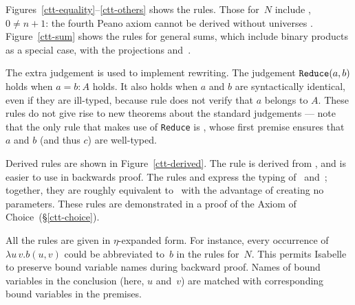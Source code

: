 Figures~\ref{ctt-equality}--\ref{ctt-others} shows the rules.  Those
for~$N$ include , $0\not=n+1$: the fourth Peano axiom
cannot be derived without universes \cite[page 91]{martinlof84}.
Figure~\ref{ctt-sum} shows the rules for general sums, which include binary
products as a special case, with the projections 
and~.

The extra judgement  is used to implement rewriting.  The
judgement ${\tt Reduce}(a,b)$ holds when $a=b:A$ holds.  It also holds
when $a$ and $b$ are syntactically identical, even if they are ill-typed,
because rule  does not verify that $a$ belongs to $A$.  These
rules do not give rise to new theorems about the standard judgements ---
note that the only rule that makes use of {\tt Reduce} is ,
whose first premise ensures that $a$ and $b$ (and thus $c$) are well-typed.

Derived rules are shown in Figure~\ref{ctt-derived}.  The rule
 is derived from , and is easier to
use in backwards proof.  The rules  and
 express the typing of~ and~;
together, they are roughly equivalent to~ with the advantage
of creating no parameters.  These rules are demonstrated in a proof of the
Axiom of Choice~(\S\ref{ctt-choice}).

All the rules are given in $\eta$-expanded form.  For instance, every
occurrence of $\lambda u\,v.b(u,v)$ could be abbreviated to~$b$ in the
rules for~$N$.  This permits Isabelle to preserve bound variable names
during backward proof.  Names of bound variables in the conclusion (here,
$u$ and~$v$) are matched with corresponding bound variables in the premises.


